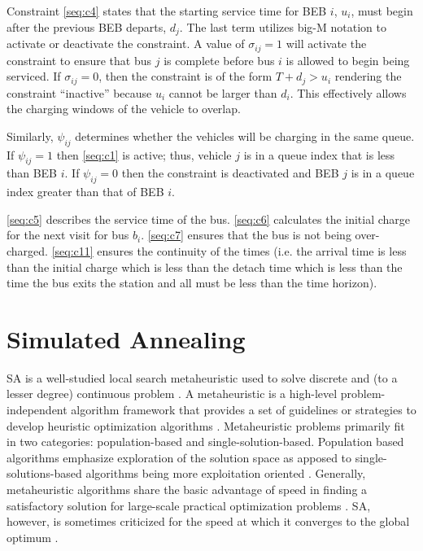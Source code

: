\documentclass[11pt,a4paper,final]{article}
\begin{document}
Constraint \ref{seq:c4} states that the starting service time for BEB \(i\), \(u_i\), must begin after the previous BEB
departs, \(d_j\). The last term utilizes big-M notation to activate or deactivate the constraint. A value of \(\sigma_{ij} = 1\)
will activate the constraint to ensure that bus \(j\) is complete before bus \(i\) is allowed to begin being serviced. If
\(\sigma_{ij} = 0\), then the constraint is of the form \(T + d_j > u_i\) rendering the constraint ``inactive'' because \(u_i\)
cannot be larger than \(d_i\). This effectively allows the charging windows of the vehicle to overlap.

Similarly, \(\psi_{ij}\) determines whether the vehicles will be charging in the same queue. If \(\psi_{ij} = 1\) then
\eqref{seq:c1} is active; thus, vehicle \(j\) is in a queue index that is less than BEB \(i\). If \(\psi_{ij} = 0\) then the
constraint is deactivated and BEB \(j\) is in a queue index greater than that of BEB \(i\).

\ref{seq:c5} describes the service time of the bus. \ref{seq:c6} calculates the initial charge for the next visit for
bus \(b_i\). \ref{seq:c7} ensures that the bus is not being over-charged. \ref{seq:c11} ensures the continuity of the
times (i.e. the arrival time is less than the initial charge which is less than the detach time which is less than the
time the bus exits the station and all must be less than the time horizon).
\section{Simulated Annealing}
\label{sec:simulated-annealing}
SA is a well-studied local search metaheuristic used to solve discrete and (to a lesser degree) continuous problem
\cite{gendreau-2018-handb-metah}. A metaheuristic is a high-level problem-independent algorithm framework that provides
a set of guidelines or strategies to develop heuristic optimization algorithms \cite{radosavljevic-2018-metah-optim}.
Metaheuristic problems primarily fit in two categories: population-based and single-solution-based. Population based
algorithms emphasize exploration of the solution space as apposed to single-solutions-based algorithms being more
exploitation oriented \cite{radosavljevic-2018-metah-optim}. Generally, metaheuristic algorithms share the basic
advantage of speed in finding a satisfactory solution for large-scale practical optimization problems
\cite{radosavljevic-2018-metah-optim}. SA, however, is sometimes criticized for the speed at which it converges to the
global optimum \cite{gendreau-2018-handb-metah,henderson-1989-theor-pract}.
\end{document}
